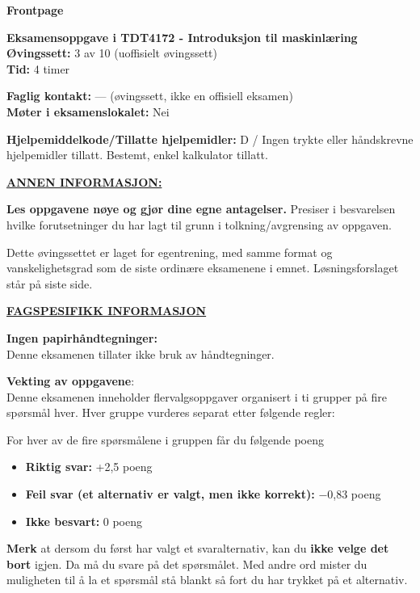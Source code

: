 \documentclass[11pt,a4paper]{article}
\begin{document}
\noindent\hspace*{-1.55em}%
{\sffamily\bfseries\fontsize{18}{22}\selectfont Frontpage}\par\vspace{1.1em}

{\bfseries Eksamensoppgave i TDT4172 - Introduksjon til maskinlæring}\\
{\bfseries Øvingssett:} 3 av 10 (uoffisielt øvingssett)\\
{\bfseries Tid:} 4 timer

\vspace{0.6em}
{\bfseries Faglig kontakt:} --- (øvingssett, ikke en offisiell eksamen)\\
{\bfseries Møter i eksamenslokalet:} Nei

\vspace{0.6em}
{\bfseries Hjelpemiddelkode/Tillatte hjelpemidler:} D / Ingen trykte eller håndskrevne hjelpemidler tillatt.
Bestemt, enkel kalkulator tillatt.

\vspace{0.6em}
{\bfseries\underline{ANNEN INFORMASJON:}}

\vspace{0.4em}
{\bfseries Les oppgavene nøye og gjør dine egne antagelser.} Presiser i besvarelsen hvilke forutsetninger du
har lagt til grunn i tolkning/avgrensing av oppgaven.

Dette øvingssettet er laget for egentrening, med samme format og vanskelighetsgrad som de
siste ordinære eksamenene i emnet. Løsningsforslaget står på siste side.

\vspace{1.6em}
{\bfseries\underline{FAGSPESIFIKK INFORMASJON}}

\vspace{0.4em}
{\bfseries Ingen papirhåndtegninger:}\\
Denne eksamenen tillater ikke bruk av håndtegninger.

\vspace{1.4em}
{\bfseries Vekting av oppgavene}:\\
Denne eksamenen inneholder flervalgsoppgaver organisert i ti grupper på fire spørsmål hver. Hver
gruppe vurderes separat etter følgende regler:

\vspace{0.6em}
For hver av de fire spørsmålene i gruppen får du følgende poeng
\begin{itemize}[leftmargin=2.2em,label=\textperiodcentered,itemsep=0pt]
\item {\bfseries Riktig svar:} +2,5 poeng
\item {\bfseries Feil svar (et alternativ er valgt, men ikke korrekt):} $-$0,83 poeng
\item {\bfseries Ikke besvart:} 0 poeng
\end{itemize}
{\bfseries Merk} at dersom du først har valgt et svaralternativ, kan du {\bfseries ikke velge det bort} igjen. Da må du
svare på det spørsmålet. Med andre ord mister du muligheten til å la et spørsmål stå blankt så fort
du har trykket på et alternativ.
\end{document}
